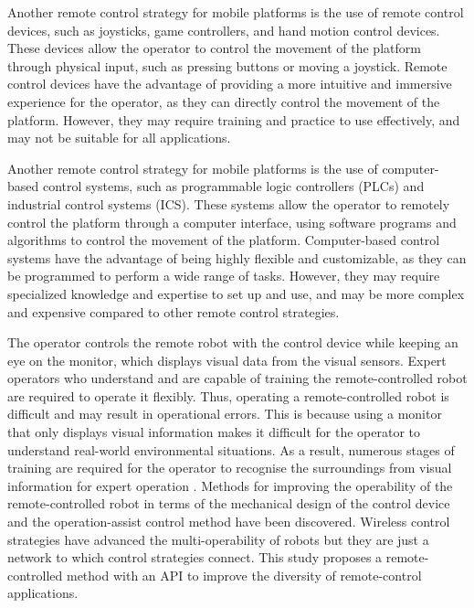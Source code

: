 Another remote control strategy for mobile platforms is the use of remote control devices, such as joysticks, game controllers, and hand motion control devices. These devices allow the operator to control the movement of the platform through physical input, such as pressing buttons or moving a joystick. Remote control devices have the advantage of providing a more intuitive and immersive experience for the operator, as they can directly control the movement of the platform. However, they may require training and practice to use effectively, and may not be suitable for all applications.

Another remote control strategy for mobile platforms is the use of computer-based control systems, such as programmable logic controllers (PLCs) and industrial control systems (ICS). These systems allow the operator to remotely control the platform through a computer interface, using software programs and algorithms to control the movement of the platform. Computer-based control systems have the advantage of being highly flexible and customizable, as they can be programmed to perform a wide range of tasks. However, they may require specialized knowledge and expertise to set up and use, and may be more complex and expensive compared to other remote control strategies.

 The operator controls the remote robot with the control device while keeping an eye on the monitor, which displays visual data from the visual sensors. Expert operators who understand and are capable of training the remote-controlled robot are required to operate it flexibly. Thus, operating a remote-controlled robot is difficult and may result in operational errors. This is because using a monitor that only displays visual information makes it difficult for the operator to understand real-world environmental situations. As a result, numerous stages of training are required for the operator to recognise the surroundings from visual information for expert operation \cite{masaki_remote-controlled_2022}. Methods for improving the operability of the remote-controlled robot in terms of the mechanical design of the control device and the operation-assist control method have been discovered. Wireless control strategies have advanced the multi-operability of robots \cite{almali_wireless_nodate} but they are just a network to which control strategies connect. This study proposes a remote-controlled method with an \ac{API} to improve the diversity of remote-control applications.

